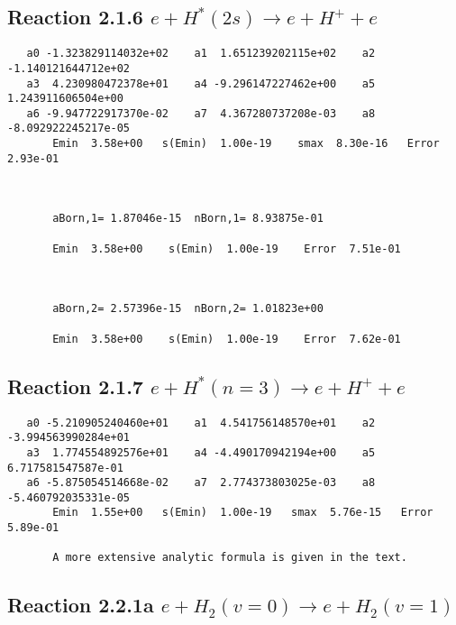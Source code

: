 \documentclass[12pt]{article}
\begin{document}
\newpage
\subsection{
Reaction 2.1.6 $   e + H^*(2s) \rightarrow e + H^+ + e$}



\begin{small}\begin{verbatim}
   a0 -1.323829114032e+02    a1  1.651239202115e+02    a2 -1.140121644712e+02
   a3  4.230980472378e+01    a4 -9.296147227462e+00    a5  1.243911606504e+00
   a6 -9.947722917370e-02    a7  4.367280737208e-03    a8 -8.092922245217e-05
       Emin  3.58e+00   s(Emin)  1.00e-19    smax  8.30e-16   Error  2.93e-01



       aBorn,1= 1.87046e-15  nBorn,1= 8.93875e-01

       Emin  3.58e+00    s(Emin)  1.00e-19    Error  7.51e-01



       aBorn,2= 2.57396e-15  nBorn,2= 1.01823e+00

       Emin  3.58e+00    s(Emin)  1.00e-19    Error  7.62e-01
\end{verbatim}\end{small}




\newpage
\subsection{
Reaction 2.1.7 $   e + H^*(n=3) \rightarrow e + H^+ + e$}



\begin{small}\begin{verbatim}
   a0 -5.210905240460e+01    a1  4.541756148570e+01    a2 -3.994563990284e+01
   a3  1.774554892576e+01    a4 -4.490170942194e+00    a5  6.717581547587e-01
   a6 -5.875054514668e-02    a7  2.774373803025e-03    a8 -5.460792035331e-05
       Emin  1.55e+00   s(Emin)  1.00e-19   smax  5.76e-15   Error  5.89e-01

       A more extensive analytic formula is given in the text.
\end{verbatim}\end{small}




\newpage
\subsection{
Reaction 2.2.1a $   e + H_2(v=0) \rightarrow e + H_2(v=1)$}
\end{document}
